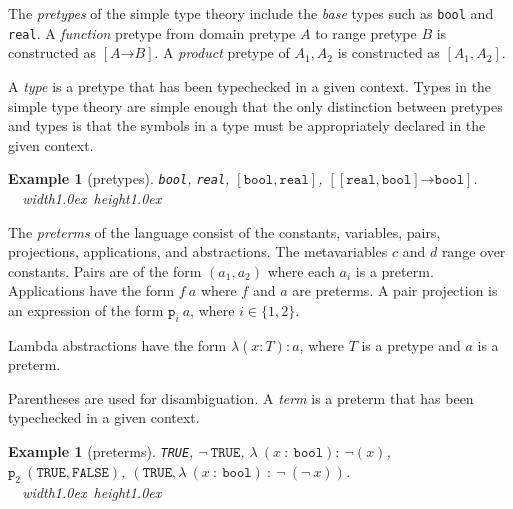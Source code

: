 \documentclass [12pt,twoside]{cslreport}
\newcommand{\thmbox}
   {{\ \hfill\hbox{%
      \vrule width1.0ex height1.0ex
   }\parfillskip 0pt }}
\newtheorem{example}[thm]{Example}
\newcommand{\aro}{\mathord\rightarrow} %
\newcommand{\funtype}[2]{[#1 \aro #2]}
\newcommand{\tupletype}[1]{[#1]}
\newcommand{\proj}[1]{\mathtt{p}_{#1}}
\newcommand{\listwo}[2]{#1_{1}, #1_{2}}
\newenvironment{Eg}[1]{\begin{example}[#1]\label{eg:#1}\em }{\thmbox\end{example}}
\begin{document}
The \emph{pretypes} of the simple type theory include the \emph{base}
types such as \texttt{bool} and \texttt{real}.  A \emph{function} pretype
from domain pretype $A$ to range pretype $B$ is constructed as
$\funtype{A}{B}$\@.  A \emph{product} pretype of ${\listwo{A}{n}}$ is
constructed as $\tupletype{\listwo{A}{n}}$.
\begin{comment}
We make no
distinction between a type $A$ and the singleton tuple type $[A]$.  We
also disallow a 0-tuple type.
\end{comment}
A \emph{type} is a pretype that has been
typechecked in a given context.  Types in the simple type theory are
simple enough  that the only distinction between pretypes and types is
that the symbols in a type must be appropriately declared in the given
context.

\begin{Eg}{pretypes} 
 \texttt{bool}, \texttt{real},
 $\tupletype
{\mathtt{bool}, \mathtt{real}}$,
 $\funtype{\tupletype{\mathtt{real}, \mathtt{bool}}}{ \mathtt{bool}}$.
\end{Eg}

The {\em preterms\/} of the language consist of the constants, variables,
pairs, projections, applications, and abstractions.  The metavariables $c$
and $d$ range over constants.  Pairs are of the form $(a_1, a_2)$ where
each $a_i$ is a preterm.  Applications have the form $f\ a$ where $f$ and
$a$ are preterms.  A pair projection is an expression of the form
$\proj{i}\ a$, where $i\in\{1, 2\}$\@.
\begin{comment}
As with types, we make no
distinction between the singleton tuple preterm $(a)$ and the preterm
$a$.
\end{comment}
Lambda abstractions have the form $\lambda (x : T): a$, where $T$
is a pretype and $a$ is a preterm.
\begin{comment}
$\lambda (x_1 : T_1, \ldots,
x_n : T_n): a$, where each $T_i$ is a type, each $x_i$ is a symbol so that
$x_i\not\equiv x_j$ for $i\neq j$, and $a$ is a preterm.
\end{comment}
Parentheses
are used for disambiguation.  A \emph{term} is a preterm that has been
typechecked in a given context.

\begin{Eg}{preterms}
\texttt{TRUE}, $\neg~\mathtt{TRUE}$,
$\lambda~(x~:~\mathtt{bool}):~\neg(x)$,\hfill\\
$\proj{2}~(\mathtt{TRUE}, \mathtt{FALSE})$,
$(\mathtt{TRUE},  \lambda~(x~:~\mathtt{bool})~:~\neg~(\neg~x))$.
\end{Eg}
\end{document}
